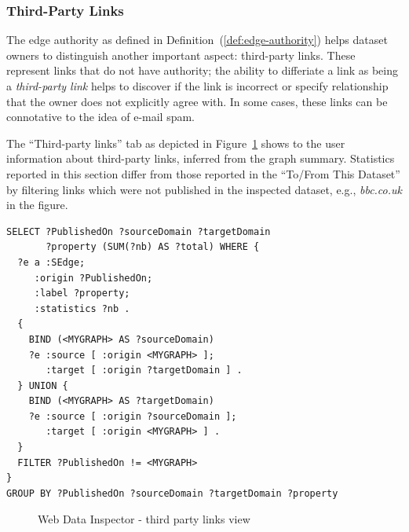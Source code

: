 \subsubsection{Third-Party Links}

The edge authority as defined in Definition~(\ref{def:edge-authority}) helps dataset owners to distinguish another important aspect: third-party links. These represent links that do not have authority; the ability to differiate a link as being a \emph{third-party link} helps to discover if the link is incorrect or specify relationship that the owner does not explicitly agree with. In some cases, these links can be connotative to the idea of e-mail spam.

The ``Third-party links'' tab as depicted in Figure~\ref{fig:wdi:thirdPartyLinks} shows to the user information about third-party links, inferred from the graph summary.
Statistics reported in this section differ from those reported in the ``To/From This Dataset'' by filtering links which were not published in the inspected dataset, e.g., \emph{bbc.co.uk} in the figure.

\begin{verbatim}
SELECT ?PublishedOn ?sourceDomain ?targetDomain
       ?property (SUM(?nb) AS ?total) WHERE {
  ?e a :SEdge;
     :origin ?PublishedOn;
     :label ?property;
     :statistics ?nb .
  {
    BIND (<MYGRAPH> AS ?sourceDomain)
    ?e :source [ :origin <MYGRAPH> ];
       :target [ :origin ?targetDomain ] .
  } UNION {
    BIND (<MYGRAPH> AS ?targetDomain)
    ?e :source [ :origin ?sourceDomain ];
       :target [ :origin <MYGRAPH> ] .
  }
  FILTER ?PublishedOn != <MYGRAPH>
}
GROUP BY ?PublishedOn ?sourceDomain ?targetDomain ?property
\end{verbatim}

\begin{figure}
	\centering
	\caption{Web Data Inspector - third party links view}
	\label{fig:wdi:thirdPartyLinks}
\end{figure}

